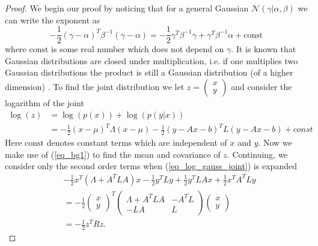 \begin{proof}
We begin our proof by noticing that for a general Gaussian $\mathcal{N}(\gamma|\alpha, \beta)$ we can write the exponent as 
\begin{equation}
-\frac{1}{2}\left(\gamma-\alpha \right)^T\beta^{-1}\left(\gamma-\alpha \right) = -\frac{1}{2}\gamma^T\beta^{-1}\gamma +\gamma^T\beta^{-1}\alpha + \text{const}
\label{eq_bg1} 
\end{equation} 
where $\text{const}$ is some real number which does not depend on $\gamma$. It is known that Gaussian distributions are closed under multiplication, i.e. if one multiplies two Gaussian distributions the product is still a Gaussian distribution (of a higher dimension) \cite{bishop}. To find the joint distribution we let $z = \begin{pmatrix}
x \\ y
\end{pmatrix}$ and consider the logarithm of the joint
\begin{equation}
\begin{aligned}
\log(z) &= \log(p(x)) + \log(p(y|x))\\
&=  -\frac{1}{2}(x-\mu)^T\Lambda(x-\mu) -\frac{1}{2}(y-Ax-b)^T L(y-Ax-b) + const
\end{aligned}
\label{eq_log_gauss_joint}
\end{equation}
Here $\text{const}$ denotes constant terms which are independent of $x$ and $y$. Now we make use of (\ref{eq_bg1}) to find the mean and covariance of $z$. Continuing, we consider only the second order terms when (\ref{eq_log_gauss_joint}) is expanded
\begin{equation}
\begin{aligned}
&-\frac{1}{2}x^T(\Lambda+A^TLA)x-\frac{1}{2}y^TLy + \frac{1}{2}y^TLAx+\frac{1}{2}x^TA^TLy \\
&= -\frac{1}{2}\begin{pmatrix}
x \\ y
\end{pmatrix}^T \begin{pmatrix}
\Lambda+A^TLA & -A^TL \\ -LA & L
\end{pmatrix}\begin{pmatrix}
x \\ y
\end{pmatrix} \\
&= -\frac{1}{2}z^TRz.
\end{aligned}
\label{eq_gauss_joint_precision}
\end{equation}

\end{proof}
